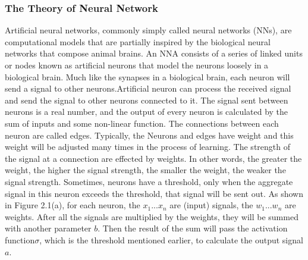 \subsubsection{The Theory of Neural Network}
\qquad Artificial neural networks, commonly simply called neural networks (NNs), are computational models that are partially inspired by the biological neural networks that compose animal brains\cite{chen2019design}. An NNA consists of a series of linked units or nodes known as artificial neurons that model the neurons loosely in a biological brain. Much like the synapses in a biological brain, each neuron will send a signal to other neurons.Artificial neuron can process the received signal and send the signal to other neurons connected to it. The signal sent between neurons is a real number, and the output of every neuron is calculated by the sum of inputs and some non-linear function. The connections between each neuron are called edges. Typically, the Neurons and edges have weight and this weight will be adjusted many times in the process of learning. The strength of the signal at a connection are effected by weights. In other words, the greater the weight, the higher the signal strength, the smaller the weight, the weaker the signal strength. Sometimes, neurons have a threshold, only when the aggregate signal in this neuron exceeds the threshold, that signal will be sent out. As shown in Figure 2.1(a), for each neuron, the $x_{1} ... x_{n} $ are (input) signals, the $w_{1} ... w_{n}$ are weights. After all the signals are multiplied by the weights, they will be summed with another parameter $b$. Then the result of the sum will pass the activation function$\sigma$, which is the threshold mentioned earlier, to calculate the output signal $a$.
